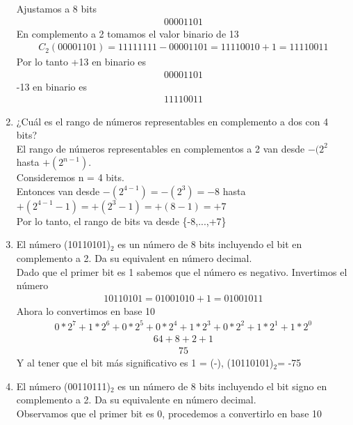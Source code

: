 \documentclass{article}
\begin{document}
\begin{enumerate}
    Ajustamos a 8 bits
    \begin{align*}
        00001101
    \end{align*}
    En complemento a 2 tomamos el valor binario de 13
    \begin{align*}
        C_2(00001101) = 11111111 - 00001101 = 11110010 + 1 = 11110011
    \end{align*}
    Por lo tanto +13 en binario es
    \begin{align*}
        00001101
    \end{align*}
    -13 en binario es
    \begin{align*}
        11110011
    \end{align*}
    \item ¿Cuál es el rango de números representables en complemento a dos con 4 bits?\\
    El rango de números representables en complementos a 2 van desde $-(2^{2}$ hasta $+(2^{n-1})$.\\
    Consideremos n = 4 bits.\\
    Entonces van desde $-(2^{4-1}) = -(2^{3}) = -8$ hasta $+(2^{4-1}-1) = +(2^{3} - 1)= +(8-1) = +7$\\
    Por lo tanto, el rango de bits va desde \{-8,...,+7\}
    \item El número (10110101)$_2$ es un número de 8 bits incluyendo el bit en complemento a 2. Da su equivalent en número decimal. \\
    Dado que el primer bit es 1 sabemos que el número es negativo. Invertimos el número
    \begin{align*}
        10110101 = 01001010 + 1 = 01001011
    \end{align*}
    Ahora lo convertimos en base 10
    \begin{align*}
        0 * 2^7 + 1 * 2^6 + 0 * 2^5 + 0 * 2^4 + 1 * 2^3 + 0 * 2^2 + 1 * 2^1 + 1 * 2^0
    \end{align*}
    \begin{align*}
        64 + 8 + 2 + 1
    \end{align*}
    \begin{align*}
        75
    \end{align*}
    Y al tener que el bit más significativo es 1 = (-), (10110101)$_2$= -75
    \item El número (00110111)$_2$ es un número de 8 bits incluyendo el bit signo en complemento a 2. Da su equivalente en número decimal.\\
    Observamos que el primer bit es 0, procedemos a convertirlo en base 10

\end{enumerate}
\end{document}
